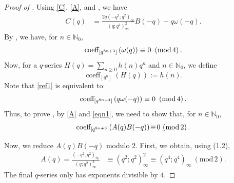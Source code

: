\documentclass[12pt,reqno]{amsart}
\renewcommand{\o}{{\omega}}
\renewcommand{\(}{\left\(}
\renewcommand{\)}{\right\)}
\newcommand{\os}[2]{\overset{#1}{#2}}
\numberwithin{equation}{section}
\theoremstyle{plain}
\theoremstyle{definition}
\numberwithin{equation}{section}
\renewcommand{\pmod}[1]{\ \left( \mathrm{mod} \, #1 \right)}
\begin{document}
\begin{proof}[Proof of ]
Using \eqref{C}, \eqref{A}, and , we have 
\begin{align}\label{eqn1}
C(q)%
&=\frac{2q\left(-q^2;q^2\right)_{\infty}}{\left(q;q^2\right)^2_{\infty}}B(-q)-q\o(-q).
\end{align}
By , we have, for $n\in \mathbb{N}_0$, 
\begin{equation}\label{ref1}
\textnormal{coeff}_{\left[q^{8n+3}\right]}\left(\o(q)\right)\equiv 0\pmod{4}.
\end{equation}
Now, for a $q$-series $H(q)=\sum_{n\ge 0}h(n)q^n$ and $n\in \mathbb{N}_0$, we define
\[
\operatorname{coeff}_{\left[q^n\right]}\left(H(q)\right):=h(n).
\]
Note that \eqref{ref1} is equivalent to \[\textnormal{coeff}_{\left[q^{8n+4}\right]}\left(q\o(-q)\right)\equiv 0\pmod{4}.\]
 Thus, to prove , by \eqref{A} and \eqref{eqn1}, we need to show that, for $n\in \mathbb{N}_0$,
\begin{align*}
 \textnormal{coeff}_{\left[q^{8n+3}\right]}\!\left(A(q)B(-q)\right)\!\equiv\! 0\!\pmod{2}.
\end{align*}

 Now, we reduce $A(q)B(-q)$ modulo $2$. First, we obtain, using (1.2), 
 \begin{align*}%
 A(q)=\frac{\left(-q^2;q^2\right)_{\infty}}{\left(q;q^2\right)^2_{\infty}}%
 &\!\equiv\!\left(q^2;q^2\right)^2_{\infty}\!\equiv\! \left(q^4;q^4\right)_{\infty}\!\pmod{2}.
 \end{align*}
 The final $q$-series only has exponents divisible by $4$.
 

\end{proof}
\end{document}
